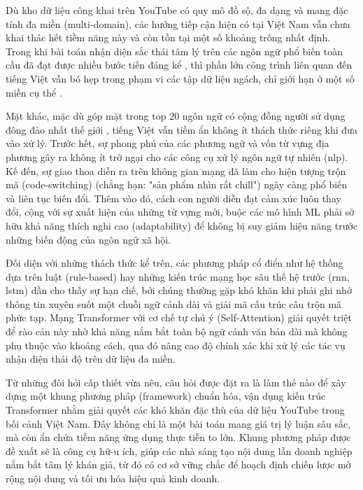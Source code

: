 Dù kho dữ liệu công khai trên YouTube có quy mô đồ sộ, đa dạng và mang đặc tính đa miền (multi-domain), các hướng tiếp cận hiện có tại Việt Nam vẫn chưa khai thác hết tiềm năng này và còn tồn tại một số khoảng trống nhất định. Trong khi bài toán nhận diện sắc thái tâm lý trên các ngôn ngữ phổ biến toàn cầu đã đạt được nhiều bước tiến đáng kể \parencite{guo2024mvindemo, zhao2024multi, shen2025zero, zhao2025interpretable, lee2026dimabsa}, thì phần lớn công trình liên quan đến tiếng Việt vẫn bó hẹp trong phạm vi các tập dữ liệu ngách, chỉ giới hạn ở một số miền cụ thể \parencite{minh2024fine, le2025hybrid, nguyen2025like}.

Mặt khác, mặc dù góp mặt trong top 20 ngôn ngữ có cộng đồng người sử dụng đông đảo nhất thế giới \parencite{ethnologue_2026}, tiếng Việt vẫn tiềm ẩn không ít thách thức riêng khi đưa vào xử lý. Trước hết, sự phong phú của các phương ngữ và vốn từ vựng địa phương gây ra không ít trở ngại cho các công cụ xử lý ngôn ngữ tự nhiên (\acrshort{nlp}). Kế đến, sự giao thoa diễn ra trên không gian mạng đã làm cho hiện tượng trộn mã (code-switching) (chẳng hạn: "sản phẩm nhìn rất chill") ngày càng phổ biến và liên tục biến đổi. Thêm vào đó, cách con người diễn đạt cảm xúc luôn thay đổi, cộng với sự xuất hiện của những từ vựng mới, buộc các mô hình ML phải sở hữu khả năng thích nghi cao (adaptability) để không bị suy giảm hiệu năng trước những biến động của ngôn ngữ xã hội.

Đối diện với những thách thức kể trên, các phương pháp cổ điển như hệ thống dựa trên luật (rule-based) hay những kiến trúc mạng học sâu thế hệ trước (\gls{rnn}, \gls{lstm}) dần cho thấy sự hạn chế, bởi chúng thường gặp khó khăn khi phải ghi nhớ thông tin xuyên suốt một chuỗi ngữ cảnh dài và giải mã cấu trúc câu trộn mã phức tạp. Mạng Transformer với cơ chế tự chú ý (Self-Attention) \parencite{vaswani2017attention} giải quyết triệt để rào cản này nhờ khả năng nắm bắt toàn bộ ngữ cảnh văn bản dài mà không phụ thuộc vào khoảng cách, qua đó nâng cao độ chính xác khi xử lý các tác vụ nhận diện thái độ trên dữ liệu đa miền.

Từ những đòi hỏi cấp thiết vừa nêu, câu hỏi được đặt ra là làm thế nào để xây dựng một khung phương pháp (framework) chuẩn hóa, vận dụng kiến trúc Transformer nhằm giải quyết các khó khăn đặc thù của dữ liệu YouTube trong bối cảnh Việt Nam. Đây không chỉ là một bài toán mang giá trị lý luận sâu sắc, mà còn ẩn chứa tiềm năng ứng dụng thực tiễn to lớn. Khung phương pháp được đề xuất sẽ là công cụ hữ-u ích, giúp các nhà sáng tạo nội dung lẫn doanh nghiệp nắm bắt tâm lý khán giả, từ đó có cơ sở vững chắc để hoạch định chiến lược mở rộng nội dung và tối ưu hóa hiệu quả kinh doanh.

